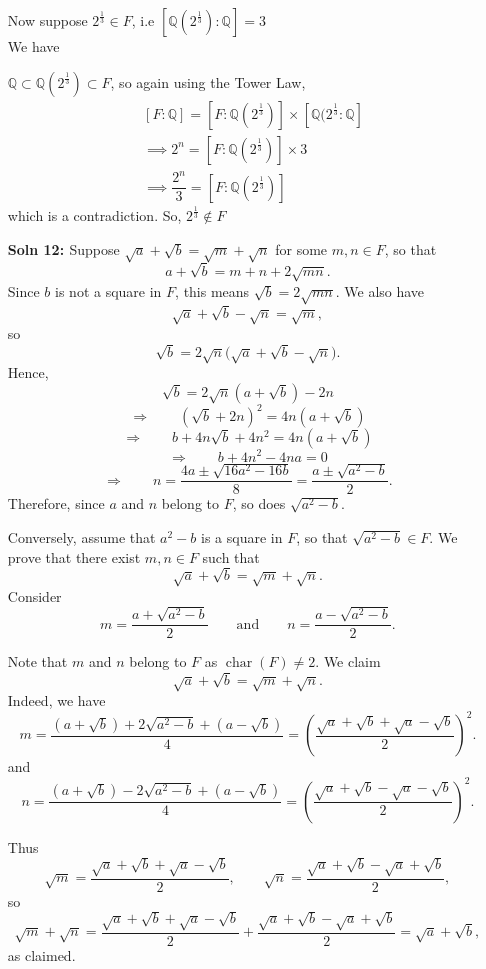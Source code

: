 \documentclass[12pt]{article}
\begin{document}
\begin{enumerate}
     Now suppose $2^\frac{1}{3} \in F$, i.e $[\mathbb{Q}(2^\frac{1}{3}):\mathbb{Q}]=3$\\
     We have 

     $\mathbb{Q} \subset \mathbb{Q}(2^\frac{1}{3}) \subset F$, so again using the Tower Law,
     \[
     \begin{aligned}
     &[F:\mathbb{Q}]= [F:\mathbb{Q}(2^\frac{1}{3})]\times[\mathbb{Q}(2^\frac{1}{3}:\mathbb{Q}] \\
     &\implies 2^n=[F:\mathbb{Q}(2^\frac{1}{3})] \times 3 \\
     &\implies \dfrac{2^n}{3}=[F:\mathbb{Q}(2^\frac{1}{3})]
      \end{aligned}
      \]
      which is a contradiction.
      So, $2^\frac{1}{3} \notin F$ 
      \item[\bf{Soln 12: }] Suppose $\sqrt{a}+\sqrt{b}=\sqrt{m}+\sqrt{n}$ for some $m,n\in F$, so that 
\[
a+\sqrt{b}=m+n+2\sqrt{mn}.
\]
Since $b$ is not a square in $F$, this means $\sqrt{b}=2\sqrt{mn}$. We also have 
\[
\sqrt{a}+\sqrt{b}-\sqrt{n}=\sqrt{m},
\]
so
\[
\sqrt{b}=2\sqrt{n}\bigl(\sqrt{a}+\sqrt{b}-\sqrt{n}\bigr).
\]
Hence,
\[
\sqrt{b}=2\sqrt{n}(a+\sqrt{b})-2n
\]
\[
\Rightarrow\qquad (\sqrt{b}+2n)^2 = 4n(a+\sqrt{b})
\]
\[
\Rightarrow\qquad b + 4n\sqrt{b} + 4n^2 = 4n(a+\sqrt{b})
\]
\[
\Rightarrow\qquad b + 4n^2 - 4na = 0
\]
\[
\Rightarrow\qquad n = \frac{4a \pm \sqrt{16a^2 - 16b}}{8}
= \frac{a \pm \sqrt{a^2 - b}}{2}.
\]
Therefore, since $a$ and $n$ belong to $F$, so does $\sqrt{a^2 - b}$.

Conversely, assume that $a^2-b$ is a square in $F$, so that $\sqrt{a^2-b}\in F$. We prove that there exist
$m,n\in F$ such that 
\[
\sqrt{a}+\sqrt{b}=\sqrt{m}+\sqrt{n}.
\]
Consider
\[
m=\frac{a+\sqrt{a^2-b}}{2}
\qquad\text{and}\qquad
n=\frac{a-\sqrt{a^2-b}}{2}.
\]

Note that $m$ and $n$ belong to $F$ as $\operatorname{char}(F)\neq 2$. We claim 
\[
\sqrt{a}+\sqrt{b} = \sqrt{m}+\sqrt{n}.
\]
Indeed, we have
\[
m = \frac{(a+\sqrt{b}) + 2\sqrt{a^2-b} + (a-\sqrt{b})}{4}
= \left(\frac{\sqrt{a}+\sqrt{b} + \sqrt{a}-\sqrt{b}}{2}\right)^2.
\]
and
\[
n=\frac{(a+\sqrt{b}) - 2\sqrt{a^{2}-b} + (a-\sqrt{b})}{4}
= \left( \frac{\sqrt{a}+\sqrt{b} - \sqrt{a}-\sqrt{b}}{2} \right)^{2}.
\]

Thus
\[
\sqrt{m}=\frac{\sqrt{a}+\sqrt{b}+\sqrt{a}-\sqrt{b}}{2}, 
\qquad 
\sqrt{n}=\frac{\sqrt{a}+\sqrt{b}-\sqrt{a}+\sqrt{b}}{2},
\]
so
\[
\sqrt{m}+\sqrt{n}
= \frac{\sqrt{a}+\sqrt{b}+\sqrt{a}-\sqrt{b}}{2}
+ \frac{\sqrt{a}+\sqrt{b}-\sqrt{a}+\sqrt{b}}{2}
= \sqrt{a}+\sqrt{b},
\]
as claimed.


\end{enumerate}
\end{document}
